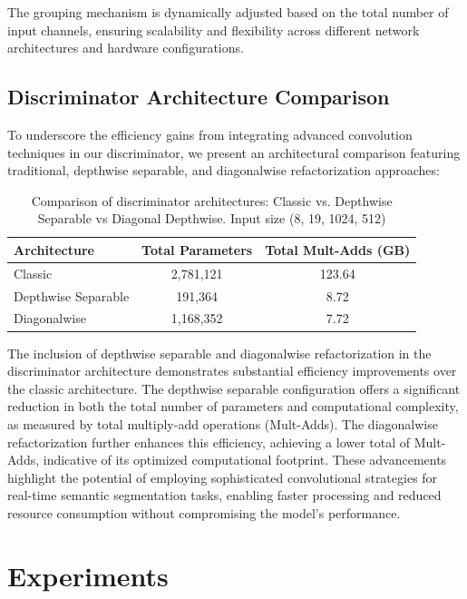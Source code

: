 \documentclass[conference]{IEEEtran}
\begin{document}
The grouping mechanism is dynamically adjusted based on the total number of input channels, ensuring scalability and flexibility across different network architectures and hardware configurations.

\subsection{Discriminator Architecture Comparison}

To underscore the efficiency gains from integrating advanced convolution techniques in our discriminator, we present an architectural comparison featuring traditional, depthwise separable, and diagonalwise refactorization approaches:


\begin{table}[h]
\centering
\caption{Comparison of discriminator architectures: Classic vs. Depthwise Separable vs Diagonal Depthwise. Input size (8, 19, 1024, 512)}
\label{tab:discriminator_comparison}
\begin{tabular}{lcc}
\hline
\textbf{Architecture} & \textbf{Total Parameters} & \textbf{Total Mult-Adds (GB)} \\
\hline
Classic & 2,781,121 & 123.64 \\
Depthwise Separable & 191,364 & 8.72 \\
Diagonalwise & 1,168,352 & 7.72 \\
\hline
\end{tabular}
\end{table}

The inclusion of depthwise separable and diagonalwise refactorization in the discriminator architecture demonstrates substantial efficiency improvements over the classic architecture. The depthwise separable configuration offers a significant reduction in both the total number of parameters and computational complexity, as measured by total multiply-add operations (Mult-Adds). The diagonalwise refactorization further enhances this efficiency, achieving a lower total of Mult-Adds, indicative of its optimized computational footprint. These advancements highlight the potential of employing sophisticated convolutional strategies for real-time semantic segmentation tasks, enabling faster processing and reduced resource consumption without compromising the model's performance.

\section{Experiments}
\end{document}
